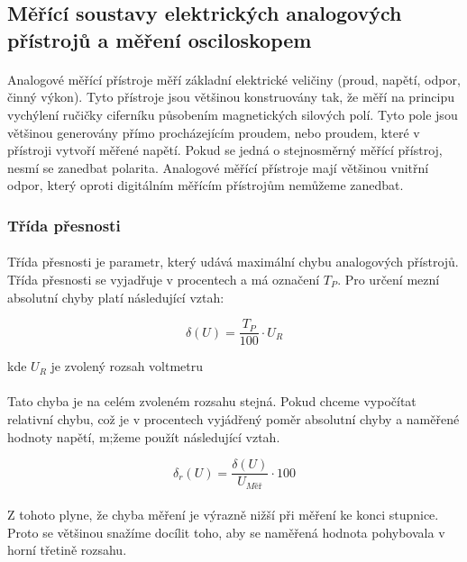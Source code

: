 \documentclass{praktikum}
\begin{document}
\subsection{Měřící soustavy elektrických analogových přístrojů a měření osciloskopem}

\paragraph{}
Analogové měřící přístroje měří základní elektrické veličiny (proud, napětí, odpor, činný výkon). Tyto přístroje jsou většinou konstruovány tak, že měří na principu vychýlení ručičky ciferníku působením magnetických silových polí. Tyto pole jsou většinou generovány přímo procházejícím proudem, nebo proudem, které v přístroji vytvoří měřené napětí. Pokud se jedná o stejnosměrný měřící přístroj, nesmí se zanedbat polarita. Analogové měřící přístroje mají většinou vnitřní odpor, který oproti digitálním měřícím přístrojům nemůžeme zanedbat.

\subsubsection{Třída přesnosti}
\paragraph{}
Třída přesnosti je parametr, který udává maximální chybu analogových přístrojů. Třída přesnosti se vyjadřuje v procentech a má označení $T_P$.
Pro určení mezní absolutní chyby platí následující vztah:

\begin{equation}
\label{eqn:mezní_absolutní_chyba}
\delta (U) = \frac{T_P}{100} \cdot U_R
\end{equation}

kde $U_R$ je zvolený rozsah voltmetru
\paragraph{}
Tato chyba je na celém zvoleném rozsahu stejná. Pokud chceme vypočítat relativní chybu, což je v procentech vyjádřený poměr absolutní chyby a naměřené hodnoty napětí, m;žeme použít následující vztah.

\begin{equation}
\label{eqn:relativní_chyba}
\delta _r (U) = \frac{\delta (U)}{U_{Měř}}\cdot 100%
\end{equation}
\paragraph{}
Z tohoto plyne, že chyba měření je výrazně nižší při měření ke konci stupnice. Proto se většinou snažíme docílit toho, aby se naměřená hodnota pohybovala v horní třetině rozsahu.
\end{document}
